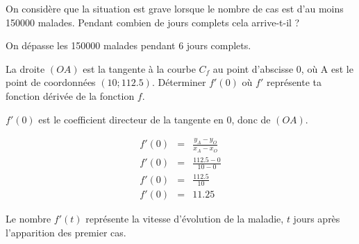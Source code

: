 \begin{questions}
	\question[2] On considère que la situation est grave lorsque le nombre de cas est d'au moins \num{150000} malades. Pendant combien de jours complets cela arrive-t-il ?
	\begin{solution}
		On dépasse les \num{150000} malades pendant 6 jours complets.
	\end{solution}
	
	\question[2] La droite $(OA)$ est la tangente à la courbe $C_f$ au point d'abscisse 0, où A est le point de coordonnées $(10;\num{112.5})$. Déterminer $f'(0)$ où $f'$ représente ta fonction dérivée de la fonction $f$.\label{q:drv}
	\begin{solution}
		$f'(0)$ est le coefficient directeur de la tangente en 0, donc de $(OA)$.
		
		\begin{eqnarray*}
			f'(0) &=& \frac{y_A - y_O}{x_A - x_O} \\
			f'(0) &=& \frac{\num{112.5} - 0}{10 - 0} \\
			f'(0) &=& \frac{\num{112.5}}{10} \\
			f'(0) &=& \num{11.25}
		\end{eqnarray*}
	\end{solution}
	
	\question Le nombre $f'(t)$ représente la vitesse d'évolution de la maladie, $t$ jours après l'apparition des premier cas.
\end{questions}


